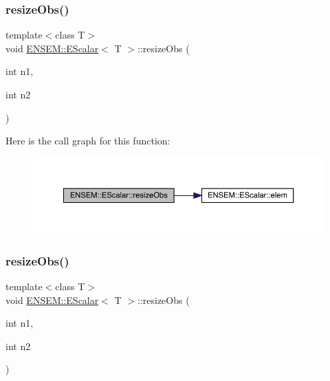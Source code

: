 \subsubsection{\texorpdfstring{resizeObs()}{resizeObs()}\hspace{0.1cm}{\footnotesize\ttfamily [5/12]}}
{\footnotesize\ttfamily template$<$class T$>$ \\
void \mbox{\hyperlink{classENSEM_1_1EScalar}{E\+N\+S\+E\+M\+::\+E\+Scalar}}$<$ T $>$\+::resize\+Obs (\begin{DoxyParamCaption}\item[{int}]{n1,  }\item[{int}]{n2 }\end{DoxyParamCaption})\hspace{0.3cm}{\ttfamily [inline]}}

Here is the call graph for this function\+:
\nopagebreak
\begin{figure}[H]
\begin{center}
\leavevmode
\includegraphics[width=350pt]{d0/d82/classENSEM_1_1EScalar_ad4fe54c2fb8a3420e1e452228d8d40b1_cgraph}
\end{center}
\end{figure}
\mbox{\label{classENSEM_1_1EScalar_ad4fe54c2fb8a3420e1e452228d8d40b1}} 
\subsubsection{\texorpdfstring{resizeObs()}{resizeObs()}\hspace{0.1cm}{\footnotesize\ttfamily [6/12]}}
{\footnotesize\ttfamily template$<$class T$>$ \\
void \mbox{\hyperlink{classENSEM_1_1EScalar}{E\+N\+S\+E\+M\+::\+E\+Scalar}}$<$ T $>$\+::resize\+Obs (\begin{DoxyParamCaption}\item[{int}]{n1,  }\item[{int}]{n2 }\end{DoxyParamCaption})\hspace{0.3cm}{\ttfamily [inline]}}

